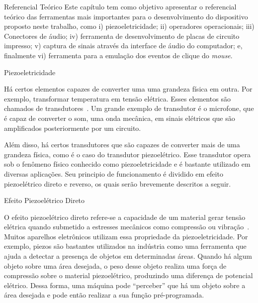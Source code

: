 \begin{chapter}{Referencial Teórico}
Este capítulo tem como objetivo apresentar o referencial teórico das ferramentas
mais importantes para o desenvolvimento do dispositivo proposto neste trabalho,
como i) piezoeletricidade; ii) operadores operacionais; iii) Conectores de
áudio; iv) ferramenta de desenvolvimento de placas de circuito impresso; v) captura de sinais
através da interface de áudio do computador; e, finalmente vi) ferramenta para a
emulação dos eventos de clique do \textit{mouse}.

\begin{section}{Piezoeletricidade}

Há certos elementos capazes de converter uma uma grandeza física em outra. Por
exemplo, transformar temperatura em tensão elétrica. Esses elementos são
chamados de transdutores~\cite{william}. Um grande exemplo de transdutor é o
microfone, que é capaz de converter o som, uma onda mecânica, em sinais
elétricos que são amplificados posteriormente por um circuito. %

Além disso, há certos transdutores que são capazes de converter mais de uma
grandeza física, como é o caso do transdutor piezoelétrico. Esse transdutor
opera sob o fenômeno físico conhecido como piezoeletricidade e é bastante
utilizado em diversas aplicações. Seu principio de funcionamento é dividido em
efeito piezoelétrico direto e reverso, os quais serão brevemente descritos a
seguir.
  
\begin{subsection}{Efeito Piezoelétrico Direto}

O efeito piezoelétrico direto refere-se a capacidade de um material gerar tensão
elétrica quando submetido a estresses mecânicos como compressão ou
vibração~\cite{jaffe2012piezoelectric}. Muitos aparelhos eletrônicos utilizam
essa propriedade da piezoeletricidade. Por exemplo, piezos são bastantes
utilizados na indústria como uma ferramenta que ajuda a detectar a presença de
objetos em determinadas áreas. Quando há algum objeto sobre uma área desejada,
o peso desse objeto realiza uma força de compressão sobre o material
piezoelétrico, produzindo uma diferença de potencial elétrico. Dessa
forma, uma máquina pode ``perceber'' que há um objeto sobre a área desejada e
pode então realizar a sua função pré-programada. %
  

\end{subsection}
\end{section}
\end{chapter}
